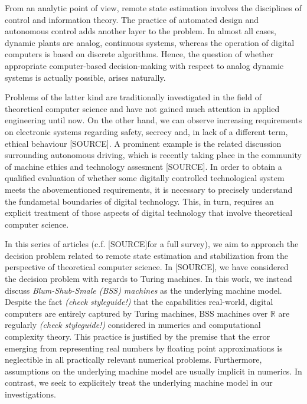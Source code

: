 \documentclass[conference]{IEEEtran}
\def\RR{{\mathbb R}}
\newcommand{\sdummy}{{\color{red}[SOURCE]}}
\begin{document}
	From an analytic point of view, remote state estimation involves the disciplines of control and information theory. 
	The practice of automated design and autonomous control adds another layer to the problem. In almost all cases, dynamic plants are analog, continuous  systems, 
	whereas the operation of digital computers is based on discrete algorithms. Hence, the question of whether appropriate computer-based decision-making with respect to analog 
	dynamic systems is actually possible, arises naturally. 

	Problems of the latter kind are traditionally investigated in the field of theoretical computer science and have not gained much attention in applied engineering until now. 
	On the other hand, we can observe increasing requirements on electronic systems regarding safety, secrecy and, in lack of a different term, ethical behaviour \sdummy. 
	A prominent example is the related discussion surrounding autonomous driving, which is recently taking place in the community of machine ethics and technology assesment \sdummy. 
	In order to obtain a qualified evaluation of whether some digitally controlled technological system meets the abovementioned requirements, it is necessary to precisely understand 
	the fundametal boundaries of digital technology. This, in turn, requires an explicit treatment of those aspects of digital technology that involve theoretical computer science.

	In this series of articles (c.f. \sdummy for a full survey), we aim to approach the decision problem related to remote state estimation and stabilization from the perspective 
	of theoretical computer science. In \sdummy, we have considered the decision problem with regards to Turing machines. In this work, we instead discuss 
	\emph{Blum-Shub-Smale (BSS) machines} as the underlying machine model. Despite the {\color{red} fact \emph{(check styleguide!)}} that the capabilities real-world, digital computers are 
	entirely captured by Turing machines, BSS machines over \(\RR\) are {\color{red} regularly \emph{(check styleguide!)}} considered in numerics and computational complexity theory. 
	This practice is justified by the premise that the error emerging from representing real numbers by floating point approximations is neglectible in all practically relevant numerical problems. 
	Furthermore, assumptions on the underlying machine model are usually implicit in numerics. In contrast, we seek to explicitely treat the underlying machine model in our investigations.
\end{document}
